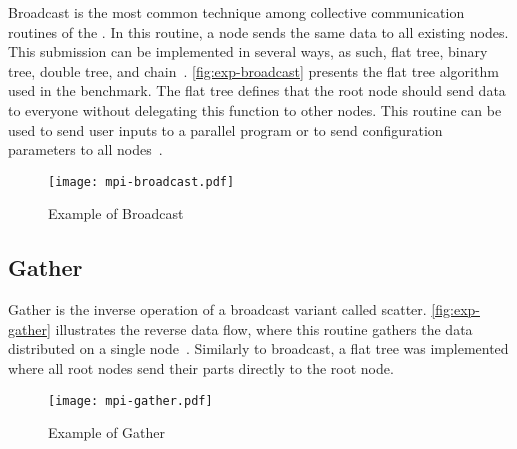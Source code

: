 			Broadcast is the most common technique among collective communication
			routines of the \mpi. In this routine, a node sends the same data to
			all existing nodes. This submission can be implemented in several ways,
			as such, flat tree, binary tree, double tree, and chain~\cite{mpi-survey}.
			\autoref{fig:exp-broadcast} presents the flat tree algorithm used in
			the benchmark. The flat tree defines that the root node should send
			data to everyone without delegating this function to other nodes.
			This routine can be used to send user inputs to a parallel program
			or to send configuration parameters to all nodes~\cite{url:mpitutorial}.

			\begin{figure}[!tb]
				\centering%
				\caption{Example of \mpi Broadcast}%
				\label{fig:exp-broadcast}%
				\texttt{[image: mpi-broadcast.pdf]}%
			\end{figure}




		\subsection{Gather}

			Gather is the inverse operation of a broadcast variant called scatter.
			\autoref{fig:exp-gather} illustrates the reverse data flow, where this
			routine gathers the data distributed on a single node~\cite{url:mpitutorial}.
			Similarly to broadcast, a flat tree was implemented where all root
			nodes send their parts directly to the root node.

			\begin{figure}[!tb]
				\centering%
				\caption{Example of \mpi Gather}%
				\label{fig:exp-gather}%
				\texttt{[image: mpi-gather.pdf]}%
			\end{figure}

